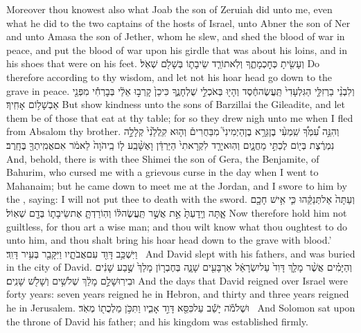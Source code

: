 {Moreover thou knowest also what Joab the son of Zeruiah did unto me, even what he did to the two captains of the hosts of Israel, unto Abner the son of Ner and unto Amasa the son of Jether, whom he slew, and shed the blood of war in peace, and put the blood of war upon his girdle that was about his loins, and in his shoes that were on his feet.}
{וְעָשִׂ֖יתָ כְּחׇכְמָתֶ֑ךָ וְלֹֽא\maqqaf תוֹרֵ֧ד שֵׂיבָת֛וֹ בְּשָׁלֹ֖ם שְׁאֹֽל׃}
{Do therefore according to thy wisdom, and let not his hoar head go down to the grave in peace.}
{וְלִבְנֵ֨י בַרְזִלַּ֤י הַגִּלְעָדִי֙ תַּֽעֲשֶׂה\maqqaf חֶ֔סֶד וְהָי֖וּ בְּאֹכְלֵ֣י שֻׁלְחָנֶ֑ךָ כִּי\maqqaf כֵן֙ קָרְב֣וּ אֵלַ֔י בְּבׇרְחִ֕י מִפְּנֵ֖י אַבְשָׁל֥וֹם אָחִֽיךָ׃}
{But show kindness unto the sons of Barzillai the Gileadite, and let them be of those that eat at thy table; for so they drew nigh unto me when I fled from Absalom thy brother.}
{וְהִנֵּ֣ה עִ֠מְּךָ֠ שִֽׁמְעִ֨י בֶן\maqqaf גֵּרָ֥א בֶן\maqqaf הַיְמִינִי֮ מִבַּחֻרִים֒ וְה֤וּא קִֽלְלַ֙נִי֙ קְלָלָ֣ה נִמְרֶ֔צֶת בְּי֖וֹם לֶכְתִּ֣י מַחֲנָ֑יִם וְהֽוּא\maqqaf יָרַ֤ד לִקְרָאתִי֙ הַיַּרְדֵּ֔ן וָאֶשָּׁ֨בַֽע ל֤וֹ בַֽיהֹוָה֙ לֵאמֹ֔ר אִם\maqqaf אֲמִֽיתְךָ֖ בֶּחָֽרֶב׃}
{And, behold, there is with thee Shimei the son of Gera, the Benjamite, of Bahurim, who cursed me with a grievous curse in the day when I went to Mahanaim; but he came down to meet me at the Jordan, and I swore to him by the \lord, saying: I will not put thee to death with the sword.}
{וְעַתָּה֙ אַל\maqqaf תְּנַקֵּ֔הוּ כִּ֛י אִ֥ישׁ חָכָ֖ם אָ֑תָּה וְיָֽדַעְתָּ֙ אֵ֣ת אֲשֶׁ֣ר תַּֽעֲשֶׂה\maqqaf לּ֔וֹ וְהֽוֹרַדְתָּ֧ אֶת\maqqaf שֵׂיבָת֛וֹ בְּדָ֖ם שְׁאֽוֹל׃}
{Now therefore hold him not guiltless, for thou art a wise man; and thou wilt know what thou oughtest to do unto him, and thou shalt bring his hoar head down to the grave with blood.’}
{וַיִּשְׁכַּ֥ב דָּוִ֖ד עִם\maqqaf אֲבֹתָ֑יו וַיִּקָּבֵ֖ר בְּעִ֥יר דָּוִֽד׃ \petucha }
{And David slept with his fathers, and was buried in the city of David.}
{וְהַיָּמִ֗ים אֲשֶׁ֨ר מָלַ֤ךְ דָּוִד֙ עַל\maqqaf יִשְׂרָאֵ֔ל אַרְבָּעִ֖ים שָׁנָ֑ה בְּחֶבְר֤וֹן מָלַךְ֙ שֶׁ֣בַע שָׁנִ֔ים וּבִירֽוּשָׁלַ֣͏ִם מָלַ֔ךְ שְׁלֹשִׁ֥ים וְשָׁלֹ֖שׁ שָׁנִֽים׃}
{And the days that David reigned over Israel were forty years: seven years reigned he in Hebron, and thirty and three years reigned he in Jerusalem.}
{וּשְׁלֹמֹ֕ה יָשַׁ֕ב עַל\maqqaf כִּסֵּ֖א דָּוִ֣ד אָבִ֑יו וַתִּכֹּ֥ן מַלְכֻת֖וֹ מְאֹֽד׃ \setuma }
{And Solomon sat upon the throne of David his father; and his kingdom was established firmly.}
